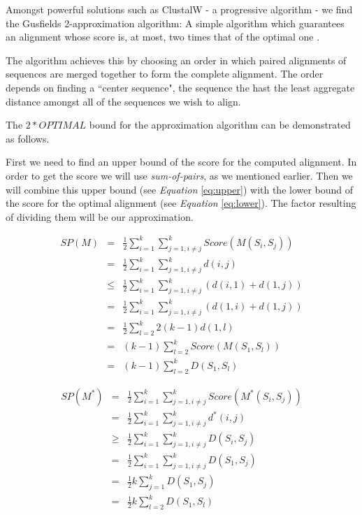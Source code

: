 \documentclass[twoside,openright,titlepage,numbers=noenddot,headinclude,%
                footinclude=true,cleardoublepage=empty,abstractoff, %
                BCOR=5mm,paper=a4,fontsize=11pt,%
                ngerman,american,%
                ]{scrreprt}
\begin{document}
Amongst powerful solutions such as ClustalW - a progressive algorithm - we find the Gusfields 2-approximation algorithm: A simple algorithm which guarantees an alignment whose score is, at most, two times that of the optimal one \cite{fu-berlin} \cite{approx2}. 

The algorithm achieves this by choosing an order in which paired alignments of sequences are merged together to form the complete alignment. The order depends on finding a ``center sequence", the sequence the hast the least aggregate distance amongst all of the sequences we wish to align.

The $2 * OPTIMAL$ bound for the approximation algorithm can be demonstrated as follows. 

First we need to find an upper bound of the score for the computed alignment. In order to get the score we will use \textit{sum-of-pairs}, as we mentioned earlier. Then we will combine this upper bound (see \textit{Equation} \ref{eq:upper}) with the lower bound of the score for the optimal alignment (see \textit{Equation} \ref{eq:lower}). The factor resulting of dividing them will be our approximation.

\begin{equation}\label{eq:upper}
    \begin{split}
        SP(M) & = & \frac{1}{2}\sum_{i=1}^{k}\sum_{j=1,i\neq j}^{k}Score(M(S_i,S_j)) \\
 & = & \frac{1}{2}\sum_{i=1}^{k}\sum_{j=1,i\neq j}^{k}d(i,j) \\
 & \le  & \frac{1}{2}\sum_{i=1}^{k}\sum_{j=1,i\neq j}^{k}(d(i,1)+d(1,j)) \\
 & = & \frac{1}{2}\sum_{i=1}^{k}\sum_{j=1,i\neq j}^{k}(d(1,i)+d(1,j)) \\
 & = & \frac{1}{2}\sum_{l=2}^{k}2(k-1)d(1,l) \\
 & = & (k-1)\sum_{l=2}^{k}Score(M(S_1,S_l)) \\
 & = & (k-1)\sum_{l=2}^{k}D(S_1,S_l)
    \end{split}
\end{equation}

\begin{equation}\label{eq:lower}
    \begin{split}
        SP(M^*) & = & \frac{1}{2}\sum_{i=1}^{k}\sum_{j=1,i\neq j}^{k}Score(M^*(S_i,S_j)) \\
 & = & \frac{1}{2}\sum_{i=1}^{k}\sum_{j=1,i\neq j}^{k}d^*(i,j) \\
 & \ge  & \frac{1}{2}\sum_{i=1}^{k}\sum_{j=1,i\neq j}^{k}D(S_i,S_j) \\
 & = & \frac{1}{2}\sum_{i=1}^{k}\sum_{j=1,i\neq j}^{k}D(S_1,S_j) \\
 & = & \frac{1}{2}k\sum_{j=1}^{k}D(S_1,S_j) \\
 & = & \frac{1}{2}k\sum_{l=2}^{k}D(S_1,S_l)
    \end{split}
\end{equation}
\end{document}
